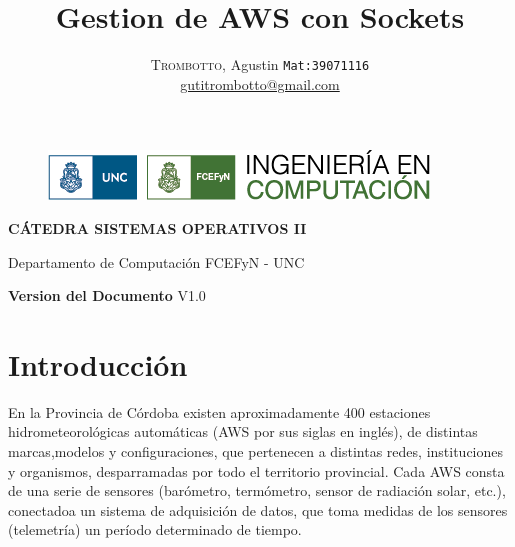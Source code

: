 \documentclass[10pt, a4paper,notitlepage]{article}
\newcommand{\HRule}{\rule{\linewidth}{0.5mm}} %
\begin{document}

 \begin{figure}[H] 
 	\centering
 	\includegraphics[scale=0.9]{./imagenes/logo_facu.png}
\end{figure}
{\center
	\huge
	\textbf{CÁTEDRA SISTEMAS OPERATIVOS II\\}}

{\center
	\Large{Departamento de Computación	FCEFyN - UNC\\}}

\title{%
		{ \bfseries{ Gestion de AWS con Sockets}}\\[0.4cm]}

\author{
\textsc{Trombotto}, Agustin  {\small \texttt{Mat:39071116}}\\
\href{mailto:gutitrombotto@gmail.com}{gutitrombotto@gmail.com}\\
}

{\let\newpage\relax\maketitle}



{\center
\textbf{Version del Documento} V1.0\\}
\clearpage

\section{Introducción}
En la Provincia de Córdoba existen aproximadamente 400 estaciones hidrometeorológicas automáticas (AWS por sus siglas en inglés), de distintas marcas,modelos y configuraciones, que pertenecen a distintas redes, instituciones y organismos, desparramadas por todo el territorio provincial. Cada AWS consta de una
serie de sensores (barómetro, termómetro, sensor de radiación solar, etc.), conectadoa un sistema de adquisición de datos, que toma medidas de los sensores (telemetría) un período determinado de tiempo.
\end{document}
